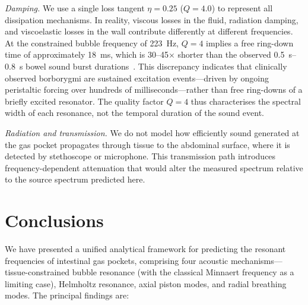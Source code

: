 \documentclass[12pt]{article}
\begin{document}
\emph{Damping.}  We use a single loss tangent $\eta = 0.25$ ($Q = 4.0$) to
represent all dissipation mechanisms.  In reality, viscous losses in the
fluid, radiation damping, and viscoelastic losses in the wall contribute
differently at different frequencies.  At the constrained bubble frequency
of \SI{223}{\hertz}, $Q = 4$ implies a free ring-down time of approximately
\SI{18}{\milli\second}, which is 30--45$\times$ shorter than the observed
\SIrange{0.5}{0.8}{\second} bowel sound burst durations~\cite{Ching2012}.
This discrepancy indicates that clinically observed borborygmi are sustained
excitation events---driven by ongoing peristaltic forcing over hundreds of
milliseconds---rather than free ring-downs of a briefly excited resonator.
The quality factor $Q = 4$ thus characterises the spectral width of each
resonance, not the temporal duration of the sound event.

\emph{Radiation and transmission.}  We do not model how efficiently sound
generated at the gas pocket propagates through tissue to the abdominal surface,
where it is detected by stethoscope or microphone.  This transmission path
introduces frequency-dependent attenuation that would alter the measured
spectrum relative to the source spectrum predicted here.

\section{Conclusions}
\label{sec:conclusions}

We have presented a unified analytical framework for predicting the resonant
frequencies of intestinal gas pockets, comprising four acoustic
mechanisms---tissue-constrained bubble resonance (with the classical Minnaert
frequency as a limiting case), Helmholtz resonance, axial piston modes, and
radial breathing modes.  The principal findings are:
\end{document}
